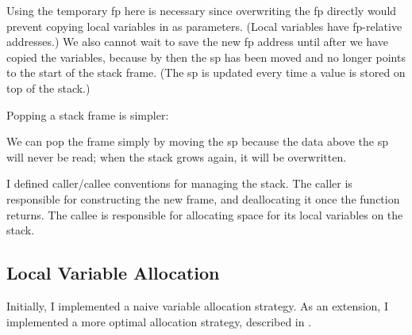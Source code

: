 \documentclass[00-main.tex]{subfiles}
\begin{document}
Using the temporary \gls{fp} here is necessary since overwriting the \gls{fp} directly would prevent copying local variables in as parameters.
(Local variables have \gls{fp}-relative addresses.)
We also cannot wait to save the new \gls{fp} address until after we have copied the variables, because by then the \gls{sp} has been moved and no longer points to the start of the stack frame.
(The \gls{sp} is updated every time a value is stored on top of the stack.)

Popping a stack frame is simpler:


We can pop the frame simply by moving the \gls{sp} because the data above the \gls{sp} will never be read; when the stack grows again, it will be overwritten.

I defined caller/callee conventions for managing the stack.
The caller is responsible for constructing the new frame, and deallocating it once the function returns.
The callee is responsible for allocating space for its local variables on the stack.


\subsection{Local Variable Allocation}\label{sec:impl:local variable allocation}

Initially, I implemented a naive variable allocation strategy.
As an extension, I implemented a more optimal allocation strategy, described in .
\end{document}
